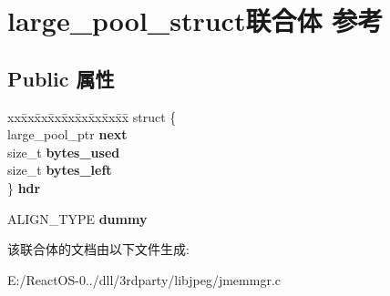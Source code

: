 \hypertarget{unionlarge__pool__struct}{}\section{large\+\_\+pool\+\_\+struct联合体 参考}
\label{unionlarge__pool__struct}
\subsection*{Public 属性}
\begin{DoxyCompactItemize}
\item 
\mbox{\label{unionlarge__pool__struct_abfcb114c6222745c249f83678f36aad8}} 
\begin{tabbing}
xx\=xx\=xx\=xx\=xx\=xx\=xx\=xx\=xx\=\kill
struct \{\\
\>large\_pool\_ptr {\bfseries next}\\
\>size\_t {\bfseries bytes\_used}\\
\>size\_t {\bfseries bytes\_left}\\
\} {\bfseries hdr}\\

\end{tabbing}\item 
\mbox{\label{unionlarge__pool__struct_a850fcb897c7fbfb12dd01193fa0c48aa}} 
A\+L\+I\+G\+N\+\_\+\+T\+Y\+PE {\bfseries dummy}
\end{DoxyCompactItemize}


该联合体的文档由以下文件生成\+:\begin{DoxyCompactItemize}
\item 
E\+:/\+React\+O\+S-\/0../dll/3rdparty/libjpeg/jmemmgr.\+c\end{DoxyCompactItemize}
